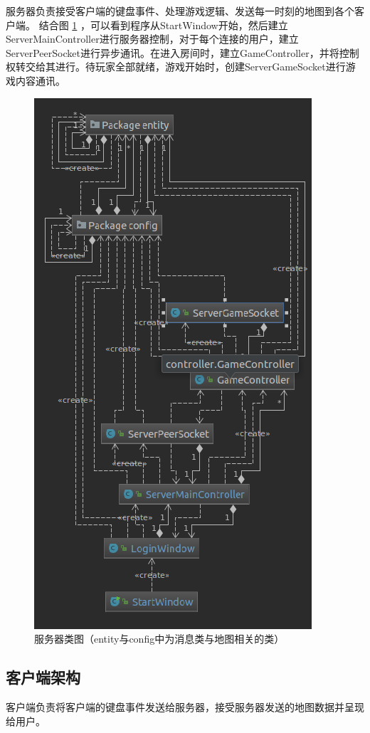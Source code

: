 \documentclass[12pt]{article}
\begin{document}
  服务器负责接受客户端的键盘事件、处理游戏逻辑、发送每一时刻的地图到各个客户端。
  结合图 \ref{fig:servercg} ，可以看到程序从StartWindow开始，然后建立ServerMainController进行服务器控制，对于每个连接的用户，建立ServerPeerSocket进行异步通讯。在进入房间时，建立GameController，并将控制权转交给其进行。待玩家全部就绪，游戏开始时，创建ServerGameSocket进行游戏内容通讯。
\begin{figure}[h]
\centering
\includegraphics[width=0.7\linewidth]{servercg}
\caption{服务器类图（entity与config中为消息类与地图相关的类）}
\label{fig:servercg}
\end{figure}

\subsection*{客户端架构}

  客户端负责将客户端的键盘事件发送给服务器，接受服务器发送的地图数据并呈现给用户。
  
\end{document}
